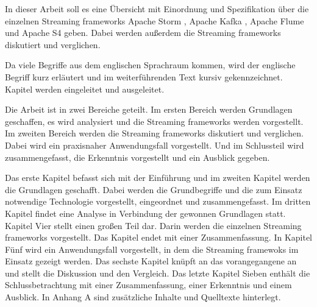 In dieser Arbeit soll es eine Übersicht mit Einordnung und Spezifikation über die einzelnen Streaming frameworks Apache Storm , Apache Kafka , Apache Flume  und Apache S4  geben. Dabei werden außerdem die Streaming frameworks diskutiert und verglichen. 

Da viele Begriffe aus dem englischen Sprachraum kommen, wird der englische Begriff kurz erläutert und im weiterführenden Text kursiv gekennzeichnet. Kapitel werden eingeleitet und ausgeleitet.

Die Arbeit ist in zwei Bereiche geteilt. Im ersten Bereich werden Grundlagen geschaffen, es wird analysiert und die Streaming frameworks werden vorgestellt. 
Im zweiten Bereich werden die Streaming frameworks diskutiert und verglichen. Dabei wird ein praxisnaher Anwendungsfall vorgestellt. Und im Schlussteil wird zusammengefasst, die Erkenntnis vorgestellt und ein Ausblick gegeben.

Das erste Kapitel befasst sich mit der Einführung und im zweiten Kapitel werden die Grundlagen geschafft. Dabei werden die Grundbegriffe und die zum Einsatz notwendige Technologie vorgestellt, eingeordnet und zusammengefasst. Im dritten Kapitel findet eine Analyse in Verbindung der gewonnen Grundlagen statt. Kapitel Vier stellt einen großen Teil dar. Darin werden die einzelnen Streaming frameworks vorgestellt. Das Kapitel endet mit einer Zusammenfassung. In Kapitel Fünf wird ein Anwendungsfall vorgestellt, in dem die Streaming framewoks im Einsatz gezeigt werden. Das sechste Kapitel knüpft an das vorangegangene an und stellt die Diskussion und den Vergleich. Das letzte Kapitel Sieben enthält die Schlussbetrachtung mit einer Zusammenfassung, einer Erkenntnis und einem Ausblick. In Anhang A sind zusätzliche Inhalte und Quelltexte hinterlegt.
